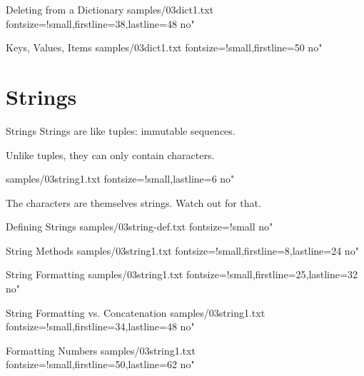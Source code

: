 \documentclass[reference]{pyslides}
\begin{document}
\begin{frame}[fragile]{Deleting from a Dictionary}
 samples/03dict1.txt fontsize=!small,firstline=38,lastline=48 no"
\end{frame}

\begin{frame}[fragile]{Keys, Values, Items}
 samples/03dict1.txt fontsize=!small,firstline=50 no"
\end{frame}


\section{Strings}

\begin{frame}[fragile]{Strings}
Strings are like tuples: immutable sequences.

Unlike tuples, they can only contain characters.

 samples/03string1.txt fontsize=!small,lastline=6 no"

\bigskip

The characters are themselves strings. Watch out for that.
\end{frame}

\begin{frame}[fragile]{Defining Strings}
 samples/03string-def.txt fontsize=!small no"
\end{frame}

\begin{frame}[fragile]{String Methods}
 samples/03string1.txt fontsize=!small,firstline=8,lastline=24 no"
\end{frame}

\begin{frame}[fragile]{String Formatting}
 samples/03string1.txt fontsize=!small,firstline=25,lastline=32 no"
\end{frame}

\begin{frame}[fragile]{String Formatting vs. Concatenation}
 samples/03string1.txt fontsize=!small,firstline=34,lastline=48 no"
\end{frame}

\begin{frame}[fragile]{Formatting Numbers}
 samples/03string1.txt fontsize=!small,firstline=50,lastline=62 no"
\end{frame}
\end{document}
